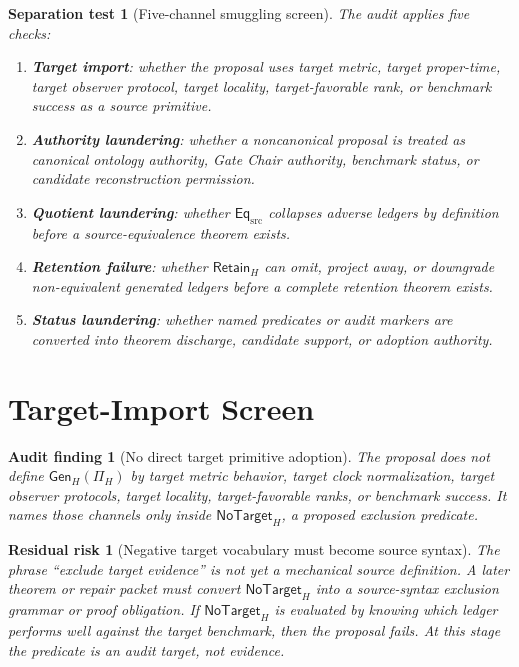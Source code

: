 \documentclass[11pt]{article}
\newcommand{\GenH}{\mathsf{Gen}_{H}}
\newcommand{\EqSrc}{\mathsf{Eq}_{\mathrm{src}}}
\newcommand{\RetainH}{\mathsf{Retain}_{H}}
\newcommand{\NoTargetH}{\mathsf{NoTarget}_{H}}
\newtheorem{auditfinding}{Audit finding}
\newtheorem{residualrisk}{Residual risk}
\newtheorem{separationtest}{Separation test}
\begin{document}
\begin{separationtest}[Five-channel smuggling screen]
The audit applies five checks:
\begin{enumerate}
    \item \textbf{Target import}: whether the proposal uses target metric,
    target proper-time, target observer protocol, target locality,
    target-favorable rank, or benchmark success as a source primitive.
    \item \textbf{Authority laundering}: whether a noncanonical proposal is
    treated as canonical ontology authority, Gate Chair authority, benchmark
    status, or candidate reconstruction permission.
    \item \textbf{Quotient laundering}: whether \(\EqSrc\) collapses adverse
    ledgers by definition before a source-equivalence theorem exists.
    \item \textbf{Retention failure}: whether \(\RetainH\) can omit,
    project away, or downgrade non-equivalent generated ledgers before a
    complete retention theorem exists.
    \item \textbf{Status laundering}: whether named predicates or audit
    markers are converted into theorem discharge, candidate support, or
    adoption authority.
\end{enumerate}
\end{separationtest}

\section{Target-Import Screen}

\begin{auditfinding}[No direct target primitive adoption]
The proposal does not define \(\GenH(\Pi_H)\) by target metric behavior,
target clock normalization, target observer protocols, target locality,
target-favorable ranks, or benchmark success. It names those channels only
inside \(\NoTargetH\), a proposed exclusion predicate.
\end{auditfinding}

\begin{residualrisk}[Negative target vocabulary must become source syntax]
The phrase ``exclude target evidence'' is not yet a mechanical source
definition. A later theorem or repair packet must convert \(\NoTargetH\)
into a source-syntax exclusion grammar or proof obligation. If \(\NoTargetH\)
is evaluated by knowing which ledger performs well against the target
benchmark, then the proposal fails. At this stage the predicate is an audit
target, not evidence.
\end{residualrisk}
\end{document}

